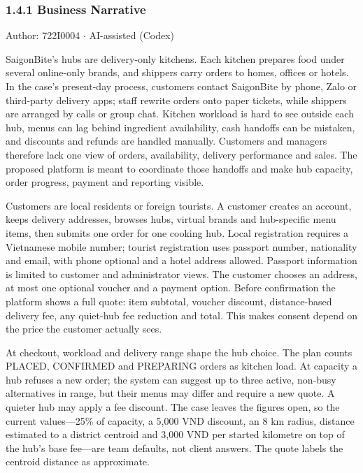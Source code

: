 \subsubsection*{1.4.1 Business Narrative}
Author: 722I0004 \ensuremath{\cdot} AI-assisted (Codex)

SaigonBite's hubs are delivery-only kitchens. Each kitchen prepares food under several online-only brands, and shippers carry orders to homes, offices or hotels. In the case's present-day process, customers contact SaigonBite by phone, Zalo or third-party delivery apps; staff rewrite orders onto paper tickets, while shippers are arranged by calls or group chat. Kitchen workload is hard to see outside each hub, menus can lag behind ingredient availability, cash handoffs can be mistaken, and discounts and refunds are handled manually. Customers and managers therefore lack one view of orders, availability, delivery performance and sales. The proposed platform is meant to coordinate those handoffs and make hub capacity, order progress, payment and reporting visible.

Customers are local residents or foreign tourists. A customer creates an account, keeps delivery addresses, browses hubs, virtual brands and hub-specific menu items, then submits one order for one cooking hub. Local registration requires a Vietnamese mobile number; tourist registration uses passport number, nationality and email, with phone optional and a hotel address allowed. Passport information is limited to customer and administrator views. The customer chooses an address, at most one optional voucher and a payment option. Before confirmation the platform shows a full quote: item subtotal, voucher discount, distance-based delivery fee, any quiet-hub fee reduction and total. This makes consent depend on the price the customer actually sees.

At checkout, workload and delivery range shape the hub choice. The plan counts PLACED, CONFIRMED and PREPARING orders as kitchen load. At capacity a hub refuses a new order; the system can suggest up to three active, non-busy alternatives in range, but their menus may differ and require a new quote. A quieter hub may apply a fee discount. The case leaves the figures open, so the current values---25\% of capacity, a 5,000 VND discount, an 8 km radius, distance estimated to a district centroid and 3,000 VND per started kilometre on top of the hub's base fee---are team defaults, not client answers. The quote labels the centroid distance as approximate.

